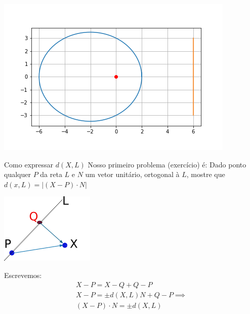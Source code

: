 \documentclass{beamer}
\begin{document}
\begin{frame}
  \includegraphics[scale=0.7]{conica4.png}
\end{frame}


\begin{frame}{Como expressar $d(X,L)$}
 Nosso primeiro problema (exercício) é: Dado ponto qualquer $P$ da reta $L$ e 
 $N$ um vetor unitário, ortogonal à $L$, mostre que $d(x,L)=|(X-P)\cdot N|$
\begin{center}
  \includegraphics{reta2.png}
\end{center}


\end{frame}
\begin{frame}

  

\end{frame} 

\begin{frame}

  Escrevemos:
  \begin{gather*}
    X-P = X-Q + Q-P \\
    X-P = \pm d(X,L)N+ Q-P \implies \\
    (X-P)\cdot N = \pm d(X,L) 
  \end{gather*}
\end{frame}
\end{document}
